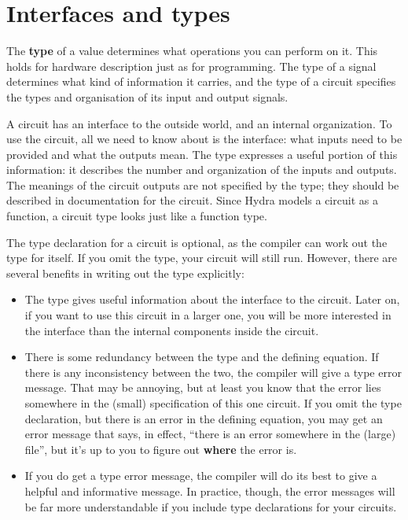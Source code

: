 \documentclass[]{svmono}
\begin{document}
\section*{Interfaces and types}
\label{sec:orgea42892}

The \textbf{type} of a value determines what operations you can perform
on it.  This holds for hardware description just as for
programming.  The type of a signal determines what kind of
information it carries, and the type of a circuit specifies the
types and organisation of its input and output signals.

A circuit has an interface to the outside world, and an internal
organization.  To use the circuit, all we need to know about is
the interface: what inputs need to be provided and what the
outputs mean.  The type expresses a useful portion of this
information: it describes the number and organization of the
inputs and outputs.  The meanings of the circuit outputs are not
specified by the type; they should be described in documentation
for the circuit.  Since Hydra models a circuit as a function, a
circuit type looks just like a function type.

The type declaration for a circuit is optional, as the compiler
can work out the type for itself.  If you omit the type, your
circuit will still run.  However, there are several benefits in
writing out the type explicitly:

\begin{itemize}
\item The type gives useful information about the interface to the
circuit.  Later on, if you want to use this circuit in a larger
one, you will be more interested in the interface than the
internal components inside the circuit.

\item There is some redundancy between the type and the defining
equation.  If there is any inconsistency between the two, the
compiler will give a type error message.  That may be annoying,
but at least you know that the error lies somewhere in the
(small) specification of this one circuit.  If you omit the type
declaration, but there is an error in the defining equation, you
may get an error message that says, in effect, ``there is an
error somewhere in the (large) file'', but it's up to you to
figure out \textbf{where} the error is.

\item If you do get a type error message, the compiler will do its
best to give a helpful and informative message.  In practice,
though, the error messages will be far more understandable if
you include type declarations for your circuits.
\end{itemize}
\end{document}
